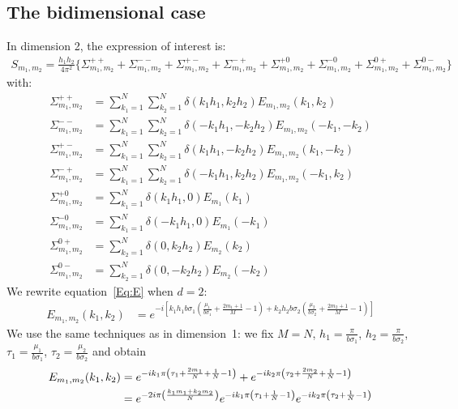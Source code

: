 \subsection{The bidimensional case}
In dimension 2, the expression of interest is:
\begin{align}
S_{m_1,m_2}=\frac{h_1h_2}{4\pi^2}\Big\{
  \Sigma_{m_1,m_2}^{++} + \Sigma_{m_1,m_2}^{--} + \Sigma_{m_1,m_2}^{+-} + \Sigma_{m_1,m_2}^{-+} +
  \Sigma_{m_1,m_2}^{+0} + \Sigma_{m_1,m_2}^{-0} + \Sigma_{m_1,m_2}^{0+} + \Sigma_{m_1,m_2}^{0-}
\Big\}
\end{align}
with:
\begin{align}
\Sigma_{m_1,m_2}^{++}&=\sum_{k_1=1}^{N}\sum_{k_2=1}^{N}\delta\left(k_1h_1,k_2h_2\right)E_{m_1,m_2}(k_1,k_2) \label{Eq:sigma++}\\
\Sigma_{m_1,m_2}^{--}&=\sum_{k_1=1}^{N}\sum_{k_2=1}^{N}\delta\left(-k_1h_1,-k_2h_2\right)E_{m_1,m_2}(-k_1,-k_2) \label{Eq:sigma--}\\
\Sigma_{m_1,m_2}^{+-}&=\sum_{k_1=1}^{N}\sum_{k_2=1}^{N}\delta\left(k_1h_1,-k_2h_2\right)E_{m_1,m_2}(k_1,-k_2) \label{Eq:sigma+-}\\
\Sigma_{m_1,m_2}^{-+}&=\sum_{k_1=1}^{N}\sum_{k_2=1}^{N}\delta\left(-k_1h_1,k_2h_2\right)E_{m_1,m_2}(-k_1,k_2) \label{Eq:sigma-+}\\
\Sigma_{m_1,m_2}^{+0}&=\sum_{k_1=1}^{N}\delta(k_1h_1,0)E_{m_1}(k_1) \label{Eq:sigma+0}\\
\Sigma_{m_1,m_2}^{-0}&=\sum_{k_1=1}^{N}\delta(-k_1h_1,0)E_{m_1}(-k_1) \label{Eq:sigma-0}\\
\Sigma_{m_1,m_2}^{0+}&=\sum_{k_2=1}^{N}\delta(0,k_2h_2)E_{m_2}(k_2) \label{Eq:sigma0+}\\
\Sigma_{m_1,m_2}^{0-}&=\sum_{k_2=1}^{N}\delta(0,-k_2h_2)E_{m_2}(-k_2) \label{Eq:sigma0-}
\end{align}
We rewrite equation~\eqref{Eq:E} when $d=2$:
\begin{align*}
  E_{m_1,m_2}(k_1,k_2)&=e^{-i\left[
    k_1h_1b\sigma_1\left(\frac{\mu_1}{b\sigma_1}+\frac{2m_1+1}{M}-1\right) +
    k_2h_2b\sigma_2\left(\frac{\mu_2}{b\sigma_2}+\frac{2m_2+1}{M}-1\right)
  \right]}
\end{align*}
We use the same techniques as in dimension~1: we fix $M=N$, $h_1=\frac{\pi}{b\sigma_1}$, $h_2=\frac{\pi}{b\sigma_2}$, $\tau_1=\frac{\mu_1}{b\sigma_1}$, $\tau_2=\frac{\mu_2}{b\sigma_2}$ and obtain
\begin{align}
  E_{m_1,m_2}(k_1,k_2)&=
     e^{-ik_1\pi\left(\tau_1+\frac{2m_1}{N}+\frac{1}{N}-1\right)} +
     e^{-ik_2\pi\left(\tau_2+\frac{2m_2}{N}+\frac{1}{N}-1\right)} \notag\\
 &= e^{-2i\pi\left(\frac{k_1m_1+k_2m_2}{N}\right)}
    e^{-ik_1\pi\left(\tau_1+\frac{1}{N}-1\right)}
    e^{-ik_2\pi\left(\tau_2+\frac{1}{N}-1\right)} \label{Eq:E2d}
\end{align}


